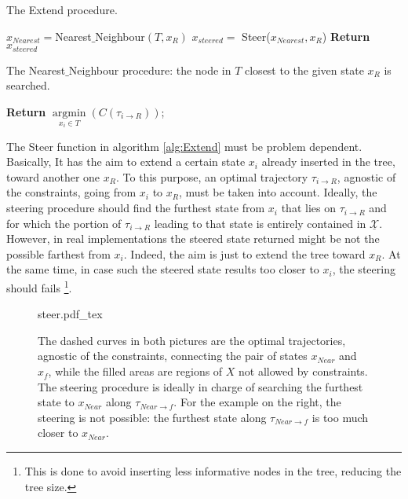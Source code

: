 \begin{algorithm}
 \caption{The Extend procedure. 
 \label{alg:Extend}}
 $x_{Nearest}=$Nearest$\_$Neighbour$(T, x_R)$\;
 $x_{steered}=$ Steer($x_{Nearest}, x_R$)\;
 \textbf{Return} $x_{steered}$\;
 \end{algorithm}

\begin{algorithm}
 \caption{The Nearest$\_$Neighbour procedure: the node in $T$ closest to the given state $x_R$ is searched.
\label{alg:NearNeigh}}
\textbf{Return} $\underset{x_i \in T}{\operatorname{argmin}}( C(\tau_{i \rightarrow R } ) )$;
\end{algorithm}

The Steer function in algorithm \ref{alg:Extend} must be problem dependent. Basically, It has the aim to extend a certain state $x_i$ already inserted in the tree, toward another one $x_R$. To this purpose, an optimal trajectory $\tau_{ i \rightarrow R}$, agnostic of the constraints, going from $x_i$ to $x_R$, must be taken into account. Ideally, the steering procedure should find the furthest state from $x_i$ that lies on  $\tau_{ i \rightarrow R}$ and for which the portion of $\tau_{ i \rightarrow R}$ leading to that state is entirely contained in 
$\underline{\mathcal{X}}$. However, in real implementations the steered state returned might be not the possible farthest from $x_i$. Indeed, the aim is just to extend the tree toward $x_R$. At the same time, in case such the steered state results too closer to $x_i$, the steering should fails \footnote{This is done to avoid inserting less informative nodes in the tree, reducing the tree size.}.

 \begin{figure}
	 \centering
 \def\svgwidth{0.45 \columnwidth}
 {steer.pdf_tex} 
	 \caption{The dashed curves in both pictures are the optimal trajectories, agnostic of the constraints, connecting the pair of states $x_{Near}$ and $x_f$, while the filled areas are regions of $X$ not allowed by constraints.
 The steering procedure is ideally in charge of searching the furthest state to $x_{Near}$ along $\tau_{ Near \rightarrow f}$. For the example on the right, the steering is not possible: the furthest state along $\tau_{ Near \rightarrow f}$ is too much closer to $x_{Near}$.}
 \label{fig:Steer}
 \end{figure}


